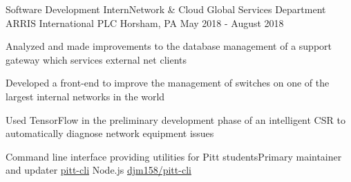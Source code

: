 \vspace{-1mm}

\vspace{-1mm}
\begin{cventries}

  \cventry
    {Software Development Intern{\enskip\cdotp\enskip}Network \& Cloud Global Services Department} %
    {ARRIS International PLC} %
    {Horsham, PA} %
    {May 2018 - August 2018} %
    {
      \begin{cvitems} %
        \item {Analyzed and made improvements to the database management of a support gateway which services external net clients}
        \item {Developed a front-end to improve the management of switches on one of the largest internal networks in the world}
        \item {Used TensorFlow in the preliminary development phase of an intelligent CSR to automatically diagnose network equipment issues}
      \end{cvitems}
    }

  \vspace{1mm}

  \cventrywork
    {Command line interface providing utilities for Pitt students{\enskip\cdotp\enskip}Primary maintainer and updater} %
    {\href{https://www.npmjs.com/package/pitt-cli}{\faCodeFork \hspace{0.5mm}pitt-cli}} %
    {Node.js} %
    {\href{https://github.com/djm158/pitt-cli}{\faGithub \hspace{0.5mm} djm158/pitt-cli}} %

  \vspace{-5mm}

\end{cventries}

